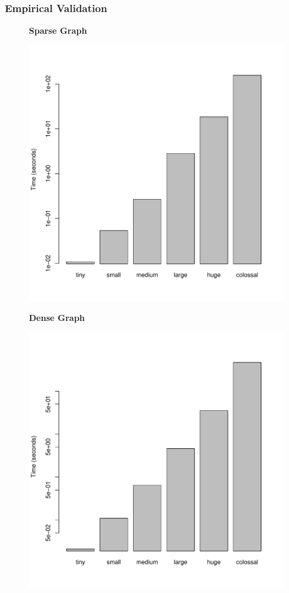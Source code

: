 \documentclass[a4paper,12pt]{article}
\begin{document}
\subsubsection{Empirical Validation}
\begin{figure}[H]
  \centering
  \textbf{Sparse Graph}\par\medskip
  \includegraphics[scale=0.3]{Johnson-FibonacciHeapsparse}
\end{figure}
\begin{figure}[H]
  \centering
  \textbf{Dense Graph}\par\medskip
  \includegraphics[scale=0.3]{Johnson-FibonacciHeapdense}
\end{figure}
\end{document}

